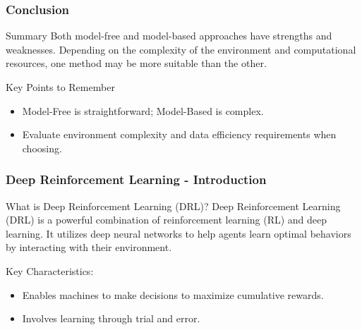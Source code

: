 \documentclass[aspectratio=169]{beamer}
\begin{document}
\begin{frame}[fragile]
    \frametitle{Conclusion}
    \begin{block}{Summary}
        Both model-free and model-based approaches have strengths and weaknesses. 
        Depending on the complexity of the environment and computational resources, one method may be more suitable than the other.
    \end{block}

    \begin{block}{Key Points to Remember}
        \begin{itemize}
            \item Model-Free is straightforward; Model-Based is complex.
            \item Evaluate environment complexity and data efficiency requirements when choosing.
        \end{itemize}
    \end{block}
\end{frame}

\begin{frame}[fragile]
    \frametitle{Deep Reinforcement Learning - Introduction}
    \begin{block}{What is Deep Reinforcement Learning (DRL)?}
        Deep Reinforcement Learning (DRL) is a powerful combination of reinforcement learning (RL) and deep learning. It utilizes deep neural networks to help agents learn optimal behaviors by interacting with their environment. 
    \end{block}
    
    \begin{block}{Key Characteristics:}
        \begin{itemize}
            \item Enables machines to make decisions to maximize cumulative rewards.
            \item Involves learning through trial and error.
        \end{itemize}
    \end{block}
\end{frame}
\end{document}
